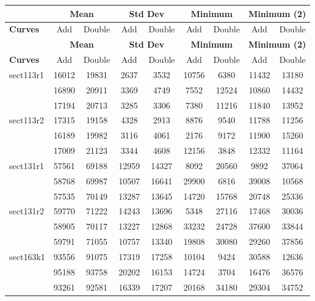 \documentclass[a4paper]{article}
\begin{document}
\begin{center}
	\begin{longtable}{ |l|c|c|c|c|c|c|c|c| }
	\hline 
	& \multicolumn{2}{|c|}{\textbf{Mean}} & \multicolumn{2}{|c|}{\textbf{Std Dev}} & \multicolumn{2}{|c|}{\textbf{Minimum}} & \multicolumn{2}{|c|}{\textbf{Minimum (2)}} \\ \hline
	\textbf{Curves} & Add & Double & Add & Double & Add & Double & Add & Double \\ \hline \endfirsthead \hline
	
	& \multicolumn{2}{|c|}{\textbf{Mean}} & \multicolumn{2}{|c|}{\textbf{Std Dev}} & \multicolumn{2}{|c|}{\textbf{Minimum}} & \multicolumn{2}{|c|}{\textbf{Minimum (2)}} \\ \hline
	\textbf{Curves} & Add & Double & Add & Double & Add & Double & Add & Double \\ \hline \endhead \hline
	
	\endfoot \hline
	\endlastfoot

sect113r1 & 16012 & 19831 & 2637 & 3532 & 10756 & 6380 & 11432 & 13180 \\
& 16890 & 20911 & 3369 & 4749 & 7552 & 12524 & 10860 & 14432 \\ 
& 17194 & 20713 & 3285 & 3306 & 7380 & 11216 & 11840 & 13952 \\ \hline

sect113r2 & 17315 & 19158 & 4328 & 2913 & 8876 & 9540 & 11788 & 11256 \\
& 16189 & 19982 & 3116 & 4061 & 2176 & 9172 & 11900 & 15260 \\
& 17009 & 21123 & 3344 & 4608 & 12156 & 3848 & 12332 & 11164 \\ \hline

sect131r1 & 57561 & 69188 & 12959 & 14327 & 8092 & 20560 & 9892 & 37064 \\
& 58768 & 69987 & 10507 & 16641 & 29900 & 6816 & 39008 & 10568 \\
& 57535 & 70149 & 13287 & 13645 & 14720 & 15768 & 20748 & 25336 \\ \hline

sect131r2 & 59770 & 71222 & 14243 & 13696 & 5348 & 27116 & 17468 & 30036 \\
& 58905 & 70117 & 13227 & 12868 & 33232 & 24728 & 37600 & 33844 \\
& 59791 & 71055 & 10757 & 13340 & 19808 & 30080 & 29260 & 37856 \\ \hline

sect163k1 & 93556 & 91075 & 17319 & 17258 & 10104 & 9424 & 30588 & 12636 \\ 
& 95188 & 93758 & 20202 & 16153 & 14724 & 3704 & 16476 & 36576 \\ 
& 93261 & 92581 & 16339 & 17207 & 20168 & 34180 & 29304 & 34752 \\ \hline


\end{longtable}
\end{center}
\end{document}
